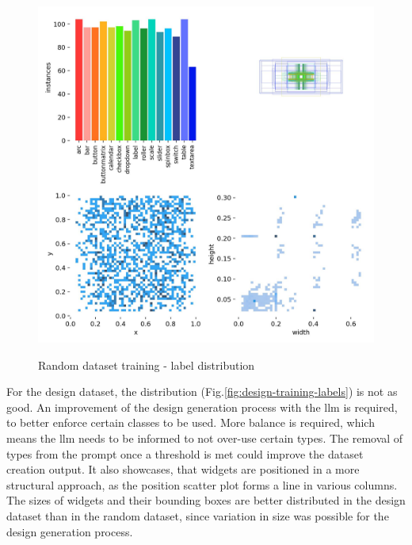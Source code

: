 \documentclass[Bachelor, BIC, english, fhCitStyle, IEEE]{BASE/twbook} %
\begin{document}
\begin{figure}[H]
    \caption{Random dataset training - label distribution}
    \centering
    \includegraphics[width=\textwidth]{PICs/train371/labels.jpg}
    \label{fig:random-training-labels}
\end{figure}
\noindent
For the design dataset, the distribution (Fig.\ref{fig:design-training-labels}) is not as good. An improvement of the design generation process with the \ac{llm} is required, to better enforce certain classes to be used. More balance is required, which means the \ac{llm} needs to be informed to not over-use certain types. The removal of types from the prompt once a threshold is met could improve the dataset creation output. It also showcases, that widgets are positioned in a more structural approach, as the position scatter plot forms a line in various columns. The sizes of widgets and their bounding boxes are better distributed in the design dataset than in the random dataset, since variation in size was possible for the design generation process.
\end{document}
